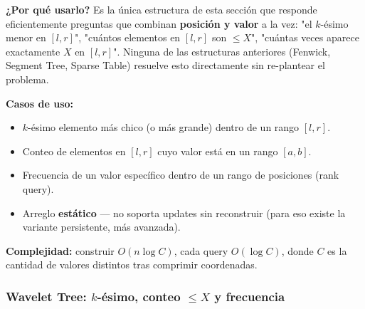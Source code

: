 \documentclass[10pt,a4paper,twocolumn]{article}
\begin{document}
\textbf{¿Por qué usarlo?} Es la única estructura de esta sección que
responde eficientemente preguntas que combinan \textbf{posición y
valor} a la vez: "el $k$-ésimo menor en $[l,r]$", "cuántos elementos
en $[l,r]$ son $\le X$", "cuántas veces aparece exactamente $X$ en
$[l,r]$". Ninguna de las estructuras anteriores (Fenwick, Segment
Tree, Sparse Table) resuelve esto directamente sin re-plantear el
problema.

\textbf{Casos de uso:}

\begin{itemize}
    \item $k$-ésimo elemento más chico (o más grande) dentro de un
    rango $[l,r]$.
    \item Conteo de elementos en $[l,r]$ cuyo valor está en un rango
    $[a,b]$.
    \item Frecuencia de un valor específico dentro de un rango de
    posiciones (rank query).
    \item Arreglo \textbf{estático} — no soporta updates sin
    reconstruir (para eso existe la variante persistente, más
    avanzada).
\end{itemize}

\textbf{Complejidad:} construir $O(n\log C)$, cada query
$O(\log C)$, donde $C$ es la cantidad de valores distintos tras
comprimir coordenadas.


\subsubsection{Wavelet Tree: $k$-ésimo, conteo $\le X$ y frecuencia}
\end{document}
